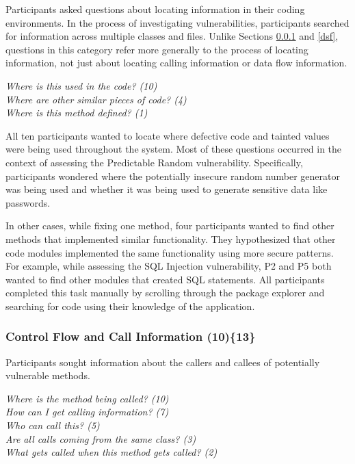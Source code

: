 \documentclass{acm_proc_article-sp}
\begin{document}
Participants asked questions about locating information in their coding environments.
In the process of investigating vulnerabilities, participants searched for information across multiple classes and files.
Unlike Sections \ref{cf} and \ref{dsf}, questions in this category refer more generally to the process of locating information, not just about locating calling information or data flow information.

\noindent\emph{Where is this used in the code? (10)} \\
\emph{Where are other similar pieces of code? (4)} \\
\emph{Where is this method defined? (1)} 

All ten participants wanted to locate where defective code and tainted values were being used throughout the system. 
Most of these questions occurred in the context of assessing the Predictable Random vulnerability.
Specifically, participants wondered where the potentially insecure random number generator was being used and whether it was being used to generate sensitive data like passwords.

In other cases, while fixing one method, four participants wanted to find other methods that implemented similar functionality.
They hypothesized that other code modules implemented the same functionality using more secure patterns. 
For example, while assessing the SQL Injection vulnerability, P2 and P5 both wanted to find other modules that created SQL statements.
All participants completed this task manually by scrolling through the package explorer and searching for code using their knowledge of the application.



\subsubsection{\textbf{Control Flow and Call Information (10)\{13\}}}\label{cf}
Participants sought information about the callers and callees of potentially vulnerable methods.


\noindent\emph{Where is the method being called? (10)} \\
\emph{How can I get calling information? (7)} \\
\emph{Who can call this? (5)} \\
\emph{Are all calls coming from the same class? (3)} \\
\emph{What gets called when this method gets called? (2)}
\end{document}
